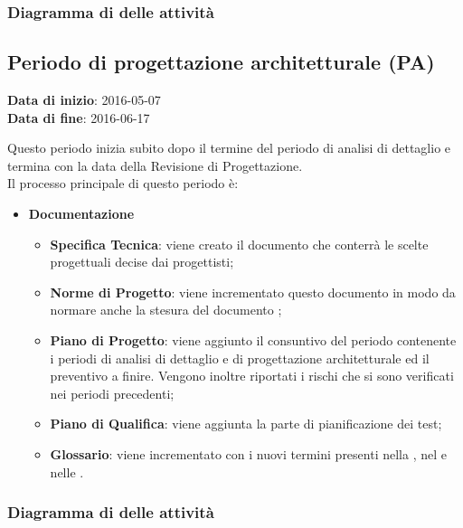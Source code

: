 		
		\subsubsection{Diagramma di  delle attività}
		
	\subsection{Periodo di progettazione architetturale (PA)}
	\begin{center}
		\textbf{Data di inizio}: 2016-05-07 \\
		\textbf{Data di fine}: 2016-06-17 \\
	\end{center}
	Questo periodo inizia subito dopo il termine del periodo di analisi di dettaglio e termina con la data della Revisione di Progettazione. \\
	Il processo principale di questo periodo è:
		\begin{itemize}
			\item \textbf{Documentazione}
			\att
			\begin{itemize}
				\item \textbf{Specifica Tecnica}: viene creato il documento \STdocRP{} che conterrà le scelte progettuali decise dai progettisti; 
				\item \textbf{Norme di Progetto}: viene incrementato questo documento in modo da normare anche la stesura del documento \STdocRP;
				\item \textbf{Piano di Progetto}: viene aggiunto il consuntivo del periodo contenente i periodi di analisi di dettaglio e di progettazione architetturale ed il preventivo a finire. Vengono inoltre riportati i rischi che si sono verificati nei periodi precedenti;
				\item \textbf{Piano di Qualifica}: viene aggiunta la parte di pianificazione dei test;
				\item \textbf{Glossario}: viene incrementato con i nuovi termini presenti nella \STdocRP, nel \PQdocRP{} e nelle \NPdocRP.
			\end{itemize}
		\end{itemize}
		\subsubsection{Diagramma di  delle attività}
		
